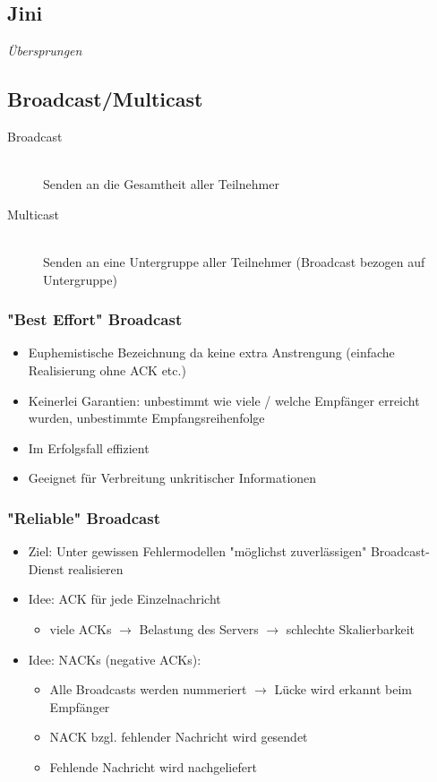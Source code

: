 \documentclass[10pt,a4paper]{article}
\begin{document}
\subsection{Jini}
\textit{Übersprungen}

\subsection{Broadcast/Multicast}
\begin{description}
\item[Broadcast]\hfill\\
Senden an die Gesamtheit aller Teilnehmer
\item[Multicast]\hfill\\
Senden an eine Untergruppe aller Teilnehmer (Broadcast bezogen auf Untergruppe)
\end{description}

\subsubsection{"Best Effort" Broadcast}
\begin{itemize}
\item Euphemistische Bezeichnung da keine extra Anstrengung (einfache Realisierung ohne ACK etc.)
\item Keinerlei Garantien: unbestimmt wie viele / welche Empfänger erreicht wurden, unbestimmte Empfangsreihenfolge
\item Im Erfolgsfall effizient
\item Geeignet für Verbreitung unkritischer Informationen
\end{itemize}

\subsubsection{"Reliable" Broadcast}
\begin{itemize}
\item Ziel: Unter gewissen Fehlermodellen "möglichst zuverlässigen" Broadcast-Dienst realisieren
\item Idee: ACK für jede Einzelnachricht
\begin{itemize}[topsep=-100ex]
\item viele ACKs $\rightarrow$ Belastung des Servers $\rightarrow$ schlechte Skalierbarkeit
\end{itemize}
\item Idee: NACKs (negative ACKs):
\begin{itemize}
\item Alle Broadcasts werden nummeriert $\rightarrow$ Lücke wird erkannt beim Empfänger
\item NACK bzgl. fehlender Nachricht wird gesendet
\item Fehlende Nachricht wird nachgeliefert
\end{itemize}
\end{itemize}
\end{document}
